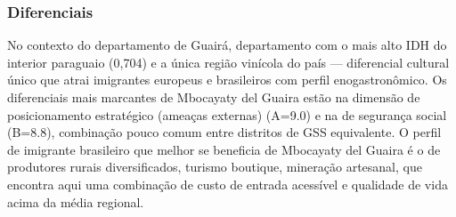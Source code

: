 \subsubsection*{Diferenciais}\label{dif-mbocayaty-del-guaira-0407}
No contexto do departamento de Guairá, departamento com o mais alto IDH do interior paraguaio (0,704) e a única região vinícola do país — diferencial cultural único que atrai imigrantes europeus e brasileiros com perfil enogastronômico. Os diferenciais mais marcantes de Mbocayaty del Guaira estão na dimensão de posicionamento estratégico (ameaças externas) (A=9.0) e na de segurança social (B=8.8), combinação pouco comum entre distritos de GSS equivalente. O perfil de imigrante brasileiro que melhor se beneficia de Mbocayaty del Guaira é o de produtores rurais diversificados, turismo boutique, mineração artesanal, que encontra aqui uma combinação de custo de entrada acessível e qualidade de vida acima da média regional.
